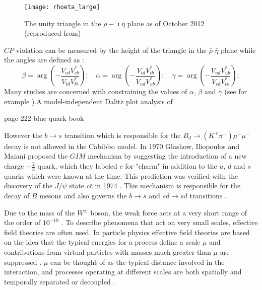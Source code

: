 \documentclass[a4paper,12pt]{article}
\begin{document}
\begin{figure}
\begin{center}
\texttt{[image: rhoeta\_large]}
\end{center}
\caption{The unity triangle in the $\bar\rho - \imath\bar\eta$ plane as of October 2012 (reproduced from)}
\label{triangle}
\end{figure}
$CP$ violation can be measured by the height of the triangle in the $\bar\rho$-$\bar\eta$ plane while the angles are defined as \cite[p. 19-20]{paper1}:
\begin{equation}
\beta = \arg \left(  -\frac{ V_{cd}V_{cb}^{\ast}}{ V_{td}V_{tb}^{\ast}}\right);\quad 
\alpha = \arg \left(  -\frac{ V_{td}V_{tb}^{\ast}}{ V_{ud}V_{ub}^{\ast}}\right);\quad 
\gamma = \arg \left(  -\frac{ V_{ud}V_{ub}^{\ast}}{ V_{cd}V_{cb}^{\ast}}\right);
\end{equation}
\color{blue} Many studies are concerned with constraining the values of $\alpha$, $\beta$ and $\gamma$ (see for example \cite{paper2 }).A model-independent Dalitz
plot analysis of 

page 222 blue quark book 

 \color{black} However the $b\rightarrow s$ transition which is responsible for the $B_d\rightarrow (K^+\pi^{-})\mu^+\mu^-$ decay is not allowed in the Cabibbo model. In 1970 Glashow, Iliopoulos and Maiani proposed the $GIM$ mechanism \cite{gim} by suggesting the introduction of a new charge $+\frac{2}{3}$ quark, which they labeled $c$ for "charm" in addition to the $u$, $d$ and $s$ quarks which were known at the time. This prediction was verified with the discovery of the $J/\psi$ state $c\bar c$ in 1974 \cite{perkins}. This mechanism is responsible for the decay of $B$ mesons and also governs the $b\to s$ and $s\bar d\to \bar s d$ transitions \cite[p. 39]{ali}. 

Due to the mass of the $W^{\pm}$ boson, the weak force acts at a very short range of the order of $10^{-18}$ \cite[p. 8]{paper5}. To describe phenomena that act on very small scales, effective field theories are often used. In particle physics effective field theories are based on the idea that the typical energies for a process define a scale $\mu$ and contributions from virtual particles with masses much greater than $\mu$ are suppressed \cite{paper37}.
$\mu$ can be thought of as the typical distance involved in the interaction, and processes operating at different scales are both spatially and temporally separated or decoupled \cite[p. 22]{paper1}.
\end{document}
